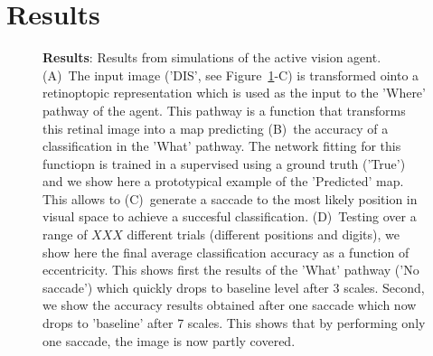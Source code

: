 \section{Results}
\label{sec:results}

\begin{figure}%
\caption{
{\bf Results}: Results from simulations of the active vision agent.
(A)~The input image ('DIS', see  Figure~\ref{fig:results}-C)  is transformed ointo a retinoptopic representation which is used as the input to the 'Where' pathway of the agent. This pathway is a function that transforms this retinal image into a map predicting (B)~the accuracy of a classification in the 'What' pathway. The network fitting for this functiopn is trained in a supervised using a ground truth ('True') and we show here a prototypical example of the 'Predicted' map. This allows to (C)~generate a saccade to the most likely position in visual space to achieve a succesful classification. (D)~Testing over a range of $XXX$ different trials (different positions and digits), we show here the final average classification accuracy as a function of eccentricity. This shows first the results of the 'What' pathway ('No saccade') which quickly drops to baseline level after 3 scales. Second, we show the accuracy results obtained after one saccade which now drops to 'baseline' after 7 scales. This shows that by performing only one saccade, the image is now partly covered.
\label{fig:results}}%
\end{figure}%




